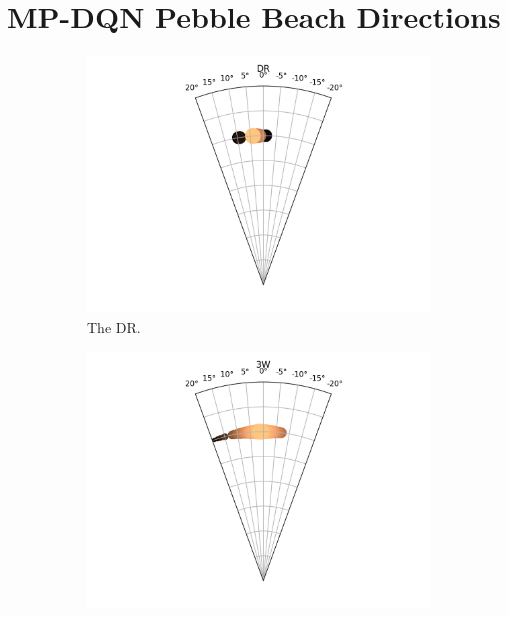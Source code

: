 \documentclass{kththesis}
\begin{document}
\chapter{MP-DQN Pebble Beach Directions}
\label{app:mpdqn_pebble_direction_choices}
\begin{figure}
    \centering
    \begin{subfigure}{0.4\textwidth}
    \centering
    \includegraphics[width=\textwidth]{AgentDirectionChoices/MPDQN_Pebble_Direction_Choices_DR.png} 
    \caption{The DR.}
    \label{fig:DR_pebble_deviation}
    \end{subfigure}
    \begin{subfigure}{0.4\textwidth}
    \centering
    \includegraphics[width=\textwidth]{AgentDirectionChoices/MPDQN_Pebble_Direction_Choices_3W.png} 

\end{subfigure}
\end{figure}
\end{document}
